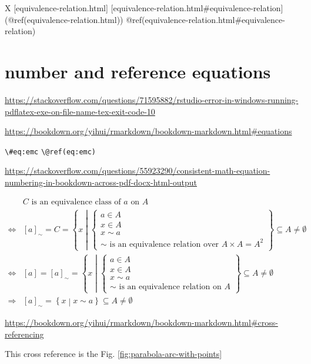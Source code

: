 \documentclass[
]{book}
\theoremstyle{definition}
\theoremstyle{definition}
\theoremstyle{definition}
\theoremstyle{definition}
\theoremstyle{remark}
\begin{document}
X {[}equivalence-relation.html{]} {[}equivalence-relation.html\#equivalence-relation{]} (@ref(equivalence-relation.html)) @ref(equivalence-relation.html\#equivalence-relation)

\hypertarget{nice-label}{%
\section{number and reference equations}\label{nice-label}}

\url{https://stackoverflow.com/questions/71595882/rstudio-error-in-windows-running-pdflatex-exe-on-file-name-tex-exit-code-10}

\url{https://bookdown.org/yihui/rmarkdown/bookdown-markdown.html\#equations}

\texttt{\textbackslash{}\#eq:emc}
\texttt{\textbackslash{}@ref(eq:emc)}

\url{https://stackoverflow.com/questions/55923290/consistent-math-equation-numbering-in-bookdown-across-pdf-docx-html-output}

\begin{equation}
\begin{aligned}
 & C\text{ is an equivalence class of }a\text{ on }A\\
\Leftrightarrow & \left[a\right]_{\sim}=C=\left\{ x\middle|\begin{cases}
a\in A\\
x\in A\\
x\sim a\\
\sim\text{ is an equivalence relation over }A\times A=A^{2}
\end{cases}\right\} \subseteq A\ne\emptyset\\
\Leftrightarrow & \left[a\right]=\left[a\right]_{\sim}=\left\{ x\middle|\begin{cases}
a\in A\\
x\in A\\
x\sim a\\
\sim\text{ is an equivalence relation on }A
\end{cases}\right\} \subseteq A\ne\emptyset\\
\Rightarrow & \left[a\right]_{\sim}=\left\{ x\middle|x\sim a\right\} \subseteq A\ne\emptyset
\end{aligned}
\label{eq:eqclass}
\end{equation}

\url{https://bookdown.org/yihui/rmarkdown/bookdown-markdown.html\#cross-referencing}

This cross reference is the Fig. \ref{fig:parabola-arc-with-points}
\end{document}
